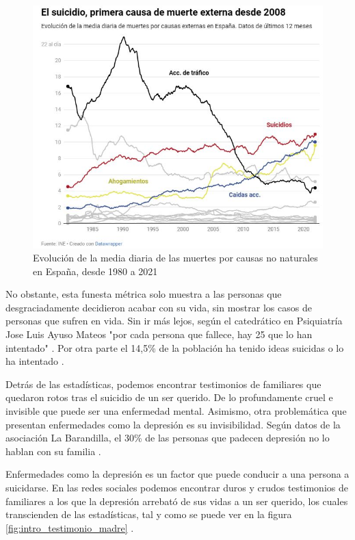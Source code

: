 \begin{figure}[h]
    \centering
    \includegraphics[width=0.85\linewidth]{figures/causas no naturales.jpg}
    \caption[Evolución de la media diaria de las muertes por causas no naturales en España, desde 1980 a 2021]{Evolución de la media diaria de las muertes por causas no naturales en España, desde 1980 a 2021 \cite{sanchez_once_2023}}
    \label{fig:intro:causas_no_naturales}
\end{figure}

No obstante, esta funesta métrica solo muestra a las personas que desgraciadamente decidieron acabar con su vida, sin mostrar los casos de personas que sufren en vida. Sin ir más lejos, según el catedrático en Psiquiatría Jose Luis Ayuso Mateos "por cada persona que fallece, hay 25 que lo han intentado"  \cite{sanchez_once_2023}.  Por otra parte el 14,5\% de la población ha tenido ideas suicidas o lo ha intentado \cite{comunicacion_cuatro_2023}.

Detrás de las estadísticas, podemos encontrar testimonios de familiares que quedaron rotos tras el suicidio de un ser querido. De lo profundamente cruel e invisible que puede ser una enfermedad mental. Asimismo, otra problemática que presentan enfermedades como la depresión es su invisibilidad. Según datos de la asociación La Barandilla, el 30\% de las personas que padecen depresión no lo hablan con su familia \cite{abc_familia_30_2021}.

Enfermedades como la depresión es un factor que puede conducir a una persona a suicidarse. En las redes sociales podemos encontrar duros y crudos testimonios de familiares a los que la depresión arrebató de sus vidas a un ser querido, los cuales transcienden de las estadísticas, tal y como se puede ver en la figura \ref{fig:intro_testimonio_madre} .

